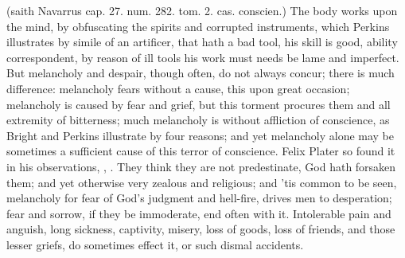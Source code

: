 { (saith Navarrus \textlatin{cap. 27. num. 282. tom. 2. cas. conscien.})
The body works upon the mind, by obfuscating the spirits and corrupted
instruments, which Perkins illustrates by simile of an artificer,
that hath a bad tool, his skill is good, ability correspondent, by
reason of ill tools his work must needs be lame and imperfect. But
melancholy and despair, though often, do not always concur; there is
much difference: melancholy fears without a cause, this upon great
occasion; melancholy is caused by fear and grief, but this torment
procures them and all extremity of bitterness; much melancholy is
without affliction of conscience, as Bright and Perkins
illustrate by four reasons; and yet melancholy alone may be sometimes a
sufficient cause of this terror of conscience. Felix Plater so
found it in his observations, , \etc{}. They think they are not
predestinate, God hath forsaken them; and yet otherwise very zealous
and religious; and 'tis common to be seen, melancholy for fear of God's
judgment and hell-fire, drives men to desperation; fear and sorrow, if
they be immoderate, end often with it. Intolerable pain and anguish,
long sickness, captivity, misery, loss of goods, loss of friends, and
those lesser griefs, do sometimes effect it, or such dismal accidents.

}
